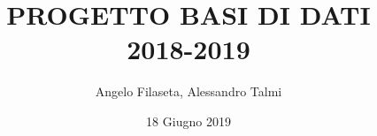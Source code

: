 \documentclass[a4paper,12pt]{report}
\title{PROGETTO BASI DI DATI\\2018-2019}
\author{Angelo Filaseta, Alessandro Talmi}
\date{18 Giugno 2019}
\begin{document}
\maketitle



\tableofcontents







\nocite{*}

\printbibliography
\end{document}

